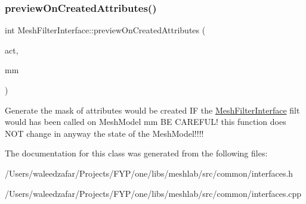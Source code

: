 \subsubsection{\texorpdfstring{preview\+On\+Created\+Attributes()}{previewOnCreatedAttributes()}}
{\footnotesize\ttfamily int Mesh\+Filter\+Interface\+::preview\+On\+Created\+Attributes (\begin{DoxyParamCaption}\item[{Q\+Action $\ast$}]{act,  }\item[{const Mesh\+Model \&}]{mm }\end{DoxyParamCaption})}

Generate the mask of attributes would be created IF the \hyperlink{class_mesh_filter_interface}{Mesh\+Filter\+Interface} filt would has been called on Mesh\+Model mm BE C\+A\+R\+E\+F\+U\+L! this function does N\+OT change in anyway the state of the Mesh\+Model!!!! 

The documentation for this class was generated from the following files\+:\begin{DoxyCompactItemize}
\item 
/\+Users/waleedzafar/\+Projects/\+F\+Y\+P/one/libs/meshlab/src/common/interfaces.\+h\item 
/\+Users/waleedzafar/\+Projects/\+F\+Y\+P/one/libs/meshlab/src/common/interfaces.\+cpp\end{DoxyCompactItemize}
